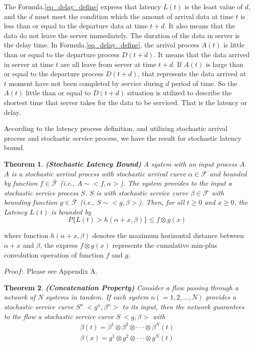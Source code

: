\documentclass[conference]{IEEEtran}
\newtheorem{theorem}{\textbf{Theorem}}
\begin{document}
The Formula.\ref{eq_delay_define} express that latency $L(t)$ is the least value of $d$, and the $d$ must meet the condition which the amount of arrival data at time $t$ is less than or equal to the departure data at time $t+d$. It also means that the data do not leave the server immediately. The duration of the data in server is the delay time. In Formula.\ref{eq_delay_define}, the arrival process $A(t)$ is little than or equal to the departure process $D(t+d)$. It means that the data arrived in server at time $t$ are all leave from server at time $t+d$. If $A(t)$ is large than or equal to the departure process $D(t+d)$, that represents the data arrived at $t$ moment have not been completed by service during $d$ period of time. So the $A(t)$ little than or equal to $D(t+d)$ situation is utilized to describe the shortest time that server takes for the data to be serviced. That is the latency or delay.

According to the latency process definition, and utilizing stochastic arrival process and stochastic service process, we have the result for stochastic latency bound.


\begin{theorem}{\bfseries (Stochastic Latency Bound)}
A system with an input process $A$. $A$ is a stochastic arrival process with stochastic arrival curve $\alpha \in \mathcal{F}$ and bounded by function $f \in \mathcal{\bar{F}}$ (i.e., $A \sim <f, \alpha>$). The system provides to the input a stochastic service process $S$. $S$ is with stochastic service curve $\beta \in \mathcal{F}$ with bounding function $g \in \mathcal{\bar{F}}$ (i.e., $S \sim <g, \beta>$). Then, for all $t\geq 0$ and $x \geq 0$, the Latency $L(t)$ is bounded by
\begin{equation}
P\{L(t)>h(\alpha+x, \beta)\}\leq f \otimes g(x)
\end{equation}
\end{theorem}
where function $h(\alpha+x, \beta)$ denotes the maximum horizontal distance between $\alpha+x$ and $\beta$, the express $f \otimes g(x)$ represents the cumulative min-plus convolution operation of function $f$ and $g$.

$Proof:$ Please see Appendix A.

\begin{theorem}{\bfseries (Concatenation Property)}
Consider a flow passing through a network of $N$ systems in tandem. If each system $n(=1,2,...,N)$ provides a stochastic service curve $S^{n}~<g^{n}, \beta^{n}>$ to its input, then the network guarantees to the flow a stochastic service curve $S~<g,\beta>$ with
\begin{align*}
\beta(t)=\beta^{1}\otimes\beta^{2}\otimes\cdot\cdot\cdot\otimes\beta^{N}(t) \\
\beta(x)=g^{1}\otimes g^{2}\otimes\cdot\cdot\cdot\otimes g^{N}(t)
\end{align*}
\end{theorem}
\end{document}
